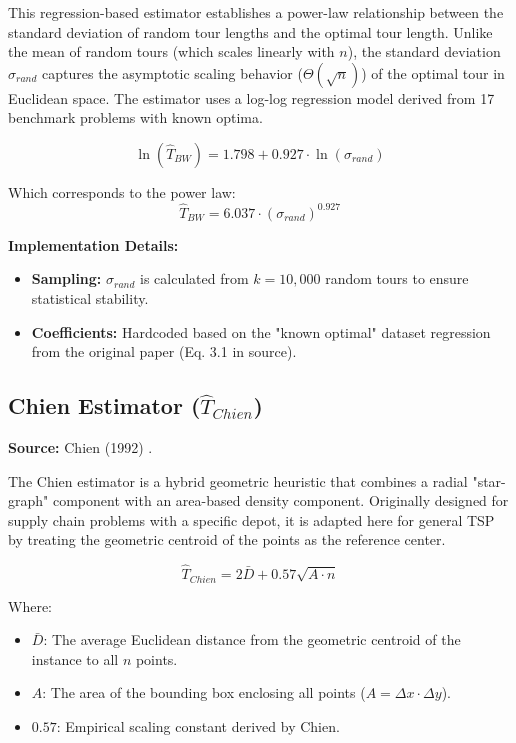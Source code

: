 \documentclass{article}
\begin{document}
This regression-based estimator establishes a power-law relationship between the standard deviation of random tour lengths and the optimal tour length. Unlike the mean of random tours (which scales linearly with $n$), the standard deviation $\sigma_{rand}$ captures the asymptotic scaling behavior ($\Theta(\sqrt{n})$) of the optimal tour in Euclidean space. The estimator uses a log-log regression model derived from 17 benchmark problems with known optima.

\begin{equation}
    \ln(\hat{T}_{BW}) = 1.798 + 0.927 \cdot \ln(\sigma_{rand})
\end{equation}

\noindent Which corresponds to the power law:
\begin{equation}
    \hat{T}_{BW} = 6.037 \cdot (\sigma_{rand})^{0.927}
\end{equation}

\noindent \textbf{Implementation Details:}
\begin{itemize}
    \item \textbf{Sampling:} $\sigma_{rand}$ is calculated from $k=10,000$ random tours to ensure statistical stability.
    \item \textbf{Coefficients:} Hardcoded based on the "known optimal" dataset regression from the original paper (Eq. 3.1 in source).
\end{itemize}

\subsection{Chien Estimator ($\hat{T}_{Chien}$)}
\textbf{Source:} Chien (1992) \cite{chien1992}.

The Chien estimator is a hybrid geometric heuristic that combines a radial "star-graph" component with an area-based density component. Originally designed for supply chain problems with a specific depot, it is adapted here for general TSP by treating the geometric centroid of the points as the reference center.

\begin{equation}
    \hat{T}_{Chien} = 2 \bar{D} + 0.57 \sqrt{A \cdot n}
\end{equation}

\noindent Where:
\begin{itemize}
    \item $\bar{D}$: The average Euclidean distance from the geometric centroid of the instance to all $n$ points.
    \item $A$: The area of the bounding box enclosing all points ($A = \Delta x \cdot \Delta y$).
    \item $0.57$: Empirical scaling constant derived by Chien.
\end{itemize}
\end{document}
